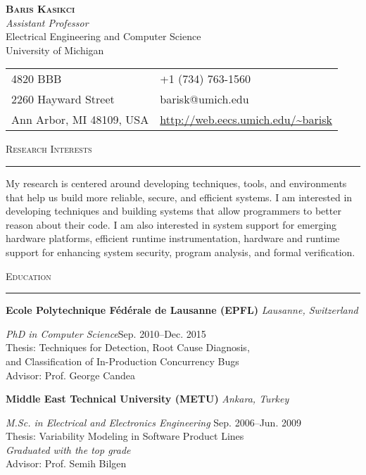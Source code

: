 \documentclass[10pt]{article}
\newcommand{\mysec}[1]{\vspace{2em}\textsc{\large #1}\vspace{1mm}\hrule\vspace{2mm}}
\newcommand{\mysub}[3]{\textbf{#1} {#2} \hfill {\em #3}}
\newcommand{\myssub}[1]{\hspace*{2mm}\parbox{163mm}{#1}\vspace*{2mm}}
\begin{document}
\begin{center}
{\Large \textbf{\textsc{Baris Kasikci}}} \vspace{1mm} \\
{\em  Assistant Professor} \\
Electrical Engineering and Computer Science \\
University of Michigan
\end{center}

\vspace{1em}

\hspace{0.8in}
\begin{tabular}{@{}p{2.5in}p{4in}}
4820 BBB & +1 (734) 763-1560\\
2260 Hayward Street & barisk@umich.edu \\
Ann Arbor, MI 48109, USA & \url{http://web.eecs.umich.edu/~barisk} \\
\end{tabular}

\vspace{1em}

\mysec{Research Interests}

My research is centered around developing techniques, tools, and environments that help us build more reliable, secure, and efficient systems. I am interested in developing techniques and building systems that allow programmers to better reason about their code. I am also interested in system support for emerging hardware platforms, efficient runtime instrumentation, hardware and runtime support for enhancing system security, program analysis, and formal verification.

\mysec{Education}

\mysub{Ecole Polytechnique F\'ed\'erale de Lausanne (EPFL)}{}{Lausanne, Switzerland} \vspace*{1mm} \\
\myssub{\vspace{2mm}\textit{PhD in Computer Science}\hfill Sep. 2010--Dec. 2015 \\
Thesis: Techniques for Detection, Root Cause Diagnosis, \\ \phantom{xxxxxx} and Classification of In-Production Concurrency Bugs \\
Advisor: Prof. George Candea} \vspace{1mm}

\mysub{Middle East Technical University (METU)}{}{Ankara, Turkey} \vspace*{1mm} \\
\myssub{\vspace{2mm}\textit{M.Sc. in Electrical and Electronics Engineering} \hfill Sep. 2006--Jun. 2009 \\
Thesis:  Variability Modeling in Software Product Lines \\
{\textit{Graduated with the top grade}} \\
Advisor: Prof. Semih Bilgen} \vspace*{1mm}
\end{document}
